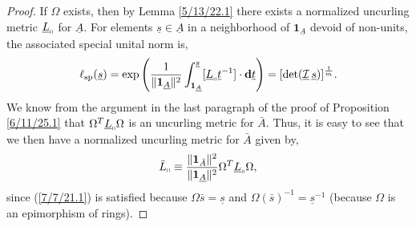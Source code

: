 \documentclass{amsart}
\theoremstyle{definition}
\numberwithin{theorem}{section}
\numberwithin{equation}{section}
\begin{document}
  \begin{proof}  
  If $\Omega$ exists, then by Lemma \ref{5/13/22.1} there exists a normalized uncurling metric $\underline{L}_{\shortparallel}$ for $\underline{A}$.  For elements $\underline{s}\in \underline{A}$ in a neighborhood of $\mathbf{1}_{\underline{A}}$ devoid of non-units, the associated special unital norm is, \begin{equation}\label{1/9/25.1} \ell_{\rm sp}(\underline{s}) =    \exp\left(\frac{1}{\|\mathbf{1}_{\underline{A}}\|^2}\int_{\mathbf{1}_{\underline{A}}}^{\underline{s}} [\underline{L}_{\shortparallel}\underline{t}^{-1}]\cdot \mathbf{d}\underline{t}\right) = [\text{det}(\underline{\mathcal{I}}\, \underline{s})]^\frac{1}{m}.\end{equation}
  We know from the argument in the last paragraph of the proof of Proposition \ref{6/11/25.1} that $\Omega^T \underline{L}_{\shortparallel} \Omega$ is an uncurling metric for $\bar{A}$.  Thus, it is easy to see that we then have a normalized uncurling metric for $\bar{A}$ given by, 
  \begin{equation}\label{1/9/25.2} \bar{L}_{\shortparallel} \equiv \frac{\|\mathbf{1}_{\bar{A}}\|^2}{\|\mathbf{1}_{\underline{A}}\|^2} \Omega^T \underline{L}_{\shortparallel} \Omega, \end{equation} since (\ref{7/7/21.1}) is satisfied because $\Omega\bar{s} =  \underline{s}$ and  $\Omega(\bar{s})^{-1} =  \underline{s}^{-1}$ (because $\Omega$ is an epimorphism of rings).
  

\end{proof}
\end{document}
